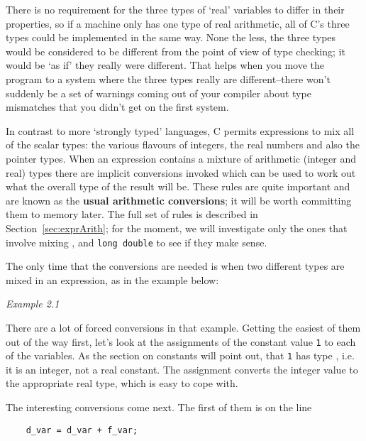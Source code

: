   There is no requirement for the three types of `real' variables to
   differ in their properties, so if a machine only has one type of real
   arithmetic, all of C's three types could be implemented in the same way.
   None the less, the three types would be considered to be different from the
   point of view of type checking; it would be `as if' they really were
   different. That helps when you move the program to a system where the three
   types really are different--there won't suddenly be a set of
   warnings coming out of your compiler about type mismatches that you didn't
   get on the first system.


  In contrast to more `strongly typed' languages, C permits
   expressions to mix all of the scalar types: the various flavours of
   integers, the real numbers and also the pointer types. When an expression
   contains a mixture of arithmetic (integer and real) types there are
   implicit conversions invoked which can be used to work out what the overall
   type of the result will be. These rules are quite important and are known
   as the \textbf{usual arithmetic conversions}; it will be worth committing
   them to memory later.
   The full set of rules is described in Section~\ref{sec:exprArith};
   for the moment, we will investigate only the ones that involve
   mixing \float, \double{} and \texttt{long double}
   to see if they make sense.


  The only time that the conversions are needed is when two different types
   are mixed in an expression, as in the example below:


   \begin{center}\textit{Example 2.1}\end{center}


  There are a lot of forced conversions in that example. Getting the
   easiest of them out of the way first, let's look at the assignments of the
   constant value \texttt{1} to each of the variables. As the section
   on constants will point out, that \texttt{1} has type \kint,
   i.e. it is an integer, not a real constant. The assignment converts the
   integer value to the appropriate real type, which is easy to cope with.


  The interesting conversions come next. The first of them is on the
   line


  \begin{Verbatim}
    d_var = d_var + f_var;
\end{Verbatim}

